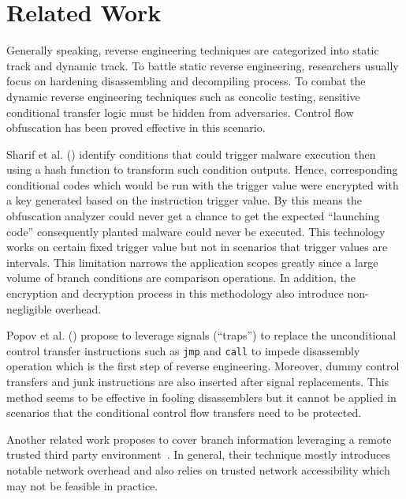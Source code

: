 \documentclass[lnicst]{svmultln}
\begin{document}
%
\section{Related Work}
%
Generally speaking, reverse engineering techniques are categorized into static
track and dynamic track. To battle static reverse engineering, researchers
usually focus on hardening disassembling and decompiling process. To combat the
dynamic reverse engineering techniques such as concolic testing, sensitive
conditional transfer logic must be hidden from adversaries. Control flow
obfuscation has been proved effective in this scenario.

Sharif et al. (\cite{Sharif}) identify conditions that could trigger malware
execution then using a hash function to transform such condition outputs. Hence,
corresponding conditional codes which would be run with the trigger value were
encrypted with a key generated based on the instruction trigger value. By this
means the obfuscation analyzer could never get a chance to get the expected
``launching code'' consequently planted malware could never be executed. This
technology works on certain fixed trigger value but not in scenarios that
trigger values are intervals. This limitation narrows the application scopes
greatly since a large volume of branch conditions are comparison operations. In
addition, the encryption and decryption process in this methodology also
introduce non-negligible overhead.

Popov et al. (\cite{Popov}) propose to leverage signals (``traps'') to replace
the unconditional control transfer instructions such as \texttt{jmp} and
\texttt{call} to impede disassembly operation which is the first step of reverse
engineering. Moreover, dummy control transfers and junk instructions are also
inserted after signal replacements. This method seems to be effective in fooling
disassemblers but it cannot be applied in scenarios that the conditional control
flow transfers need to be protected.

Another related work proposes to cover branch information leveraging a remote
trusted third party environment~\cite{Zhi}. In general, their technique mostly
introduces notable network overhead and also relies on trusted network
accessibility which may not be feasible in practice. 
\end{document}
